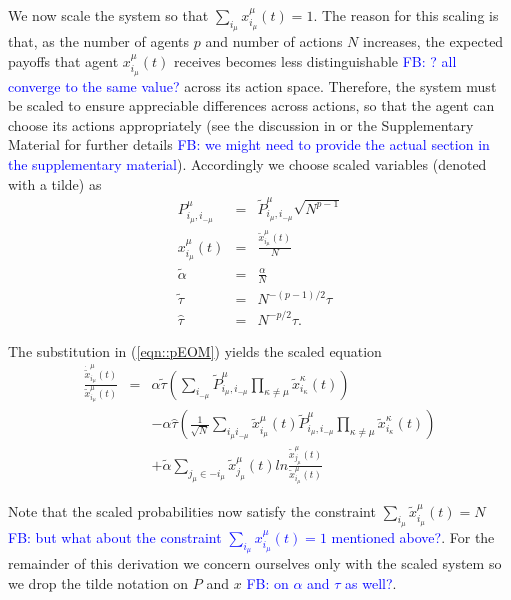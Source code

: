 \documentclass[sigconf,anonymous]{aamas}
\newcommand{\xmu}[2]{x_{#1_#2}^{#2}(t)}
\newcommand{\payoff}[2]{P^{#2}_{#1_#2, #1_{-#2}}}
\newcommand{\txmu}[2]{\tilde{x}_{#1_#2}^{#2}(t)}
\newcommand{\dtxmu}[2]{\dot{\tilde{x}}_{#1_#2}^{#2}(t)}
\newcommand{\tpayoff}[2]{\tilde{P}^{#2}_{#1_#2, #1_{-#2}}}
\newcommand{\talpha}{\tilde{\alpha}}
\newcommand{\ttau}{\tilde{\tau}}
\newcommand{\htau}{\hat{\tau}}
\newcommand\fb[1]{\textcolor{blue}{FB: #1}}
\begin{document}
We now scale the system so that $\sum_{i_\mu} \xmu{i}{\mu} = 1$. The
reason for this scaling is that, as the number of agents $p$ and
number of actions $N$ increases, the expected payoffs that agent
$\xmu{i}{\mu}$ receives becomes less distinguishable \fb{? all converge to the same value?} across its action
space. Therefore, the system must be scaled to ensure appreciable
differences across actions, so that the agent can choose its actions
appropriately (see the discussion in \cite{Sanders2018} or the
Supplementary Material for further details \fb{we might need to provide the actual section in the supplementary material}). Accordingly we choose
scaled variables (denoted with a tilde) as
%
\begin{eqnarray*}
        \payoff{i}{\mu} & = & \tpayoff{i}{\mu} \sqrt{N^{p-1}}\\
        \xmu{i}{\mu} & = & \frac{\txmu{i}{\mu}}{N} \\
        \talpha & = & \frac{\alpha}{N} \\
        \ttau & = & N^{-(p-1)/2} \tau \\
        \htau & = & N^{-p/2} \tau.
\end{eqnarray*}

The substitution in (\ref{eqn::pEOM}) yields the scaled equation
%
\begin{eqnarray}
    \frac{\dtxmu{i}{\mu}}{\txmu{i}{\mu}} & = & \alpha \ttau \left ( \sum_{i_{-\mu}} \tpayoff{i}{\mu} \prod_{\kappa \neq \mu} \txmu{i}{\kappa} \right ) \nonumber \\ & &  - \alpha \htau \left ( \frac{1}{\sqrt{N}} \sum_{i_\mu i_{-\mu}} \txmu{i}{\mu} \tpayoff{i}{\mu} \prod_{\kappa \neq \mu} \txmu{i}{\kappa} \right ) \nonumber  \\  & & + \talpha \sum_{j_\mu \in -i_\mu} \txmu{j}{\mu} ln \frac{\txmu{j}{\mu}}{\txmu{i}{\mu}}    \label{eqn::scaledEOM}
\end{eqnarray}

Note that the scaled probabilities now satisfy the constraint
$\sum_{i_\mu} \txmu{i}{\mu} = N$ \fb{but what about the constraint $\sum_{i_\mu} \xmu{i}{\mu} = 1$ mentioned above?}. For the remainder of this derivation
we concern ourselves only with the scaled system so we drop the tilde
notation on $P$ and $x$ \fb{on $\alpha$ and $\tau$ as well?}.
\end{document}

